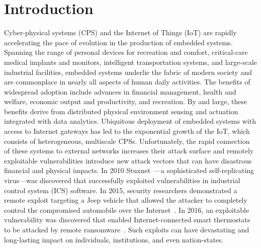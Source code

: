 \chapter{Introduction}\label{chapter:introduction}

Cyber-physical systems (CPS) and the Internet of Things (IoT) are rapidly accelerating the pace of evolution in the production of embedded systems. Spanning the range of personal devices for recreation and comfort, critical-care medical implants and monitors, intelligent transportation systems, and large-scale industrial facilities, embedded systems underlie the fabric of modern society and are commonplace in nearly all aspects of human daily activities. The benefits of widespread adoption include advances in financial management, health and welfare, economic output and productivity, and recreation. By and large, these benefits derive from distributed physical environment sensing and actuation integrated with data analytics. %
%
Ubiquitous deployment of embedded systems with access to Internet gateways has led to the exponential growth of the IoT, which consists of heterogeneous, multiscale CPSs. Unfortunately, the rapid connection of these systems to external networks increases their attack surface and remotely exploitable vulnerabilities introduce new attack vectors that can have disastrous financial and physical impacts. In 2010 Stuxnet~\cite{stuxnet}---a sophisticated self-replicating virus---was discovered that successfully exploited vulnerabilities in industrial control system (ICS) software. In 2015, security researchers demonstrated a remote exploit targeting a Jeep vehicle that allowed the attacker to completely control the compromised automobile over the Internet~\cite{jeep_vulnerability}. In 2016, an exploitable vulnerability was discovered that enabled Internet-connected smart thermostats to be attacked by remote ransomware~\cite{smart_thermostat}. Such exploits can have devastating and long-lasting impact on individuals, institutions, and even nation-states.

